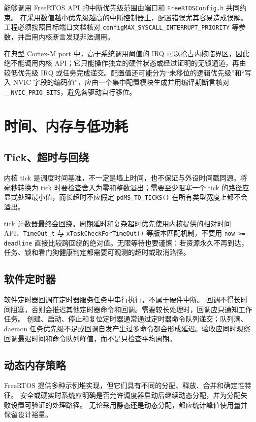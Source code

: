 能够调用 FreeRTOS API 的中断优先级范围由端口和 \texttt{FreeRTOSConfig.h} 共同约束。
在采用数值越小优先级越高的中断控制器上，配置错误尤其容易造成误解。
工程必须按照目标端口文档核对 \texttt{configMAX\_SYSCALL\_INTERRUPT\_PRIORITY} 等参数，并启用内核断言发现非法调用。

在典型 Cortex-M port 中，高于系统调用阈值的 IRQ 可以抢占内核临界区，因此绝不能调用内核 API；它只能操作独立的硬件状态或经过证明的无锁通道，再由较低优先级 IRQ 或任务完成递交。配置值还可能分为“未移位的逻辑优先级”和“写入 NVIC 字段的编码值”，应由一个集中配置模块生成并用编译期断言核对 \texttt{\_\_NVIC\_PRIO\_BITS}，避免各驱动自行移位。

\section{时间、内存与低功耗}

\subsection{Tick、超时与回绕}

内核 tick 是调度时间基准，不一定是墙上时间，也不保证与外设时间戳同源。将毫秒转换为 tick 时要检查舍入为零和整数溢出；需要至少阻塞一个 tick 的路径应显式处理最小值，而长超时不应假定 \texttt{pdMS\_TO\_TICKS()} 在所有类型宽度上都不会溢出。

tick 计数器最终会回绕。周期延时和复杂超时优先使用内核提供的相对时间 API、\texttt{TimeOut\_t} 与 \texttt{xTaskCheckForTimeOut()} 等版本匹配机制，不要用 \texttt{now >= deadline} 直接比较跨回绕的绝对值。无限等待也要谨慎：若资源永久不再到达，任务、锁和看门狗健康判定都需要可观测的超时或取消路径。

\subsection{软件定时器}

软件定时器回调在定时器服务任务中串行执行，不属于硬件中断。
回调不得长时间阻塞，否则会推迟其他定时器命令和回调。需要较长处理时，回调应只通知工作任务。
创建、启动、停止和复位定时器通常通过定时器命令队列递交；队列满、daemon 任务优先级不足或回调自发产生过多命令都会形成延迟。验收应同时观察回调最迟时间和命令队列峰值，而不是只检查平均周期。

\subsection{动态内存策略}

FreeRTOS 提供多种示例堆实现，但它们具有不同的分配、释放、合并和确定性特征。
安全或硬实时系统应明确是否允许调度器启动后继续动态分配，并为分配失败设置可验证的处理路径。
无论采用静态还是动态分配，都应统计峰值使用量并保留设计裕量。


